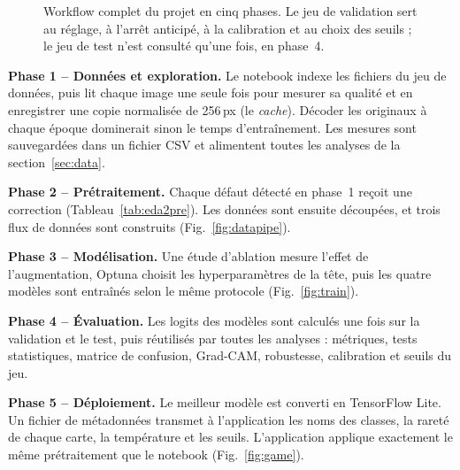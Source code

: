 \documentclass[conference]{IEEEtran}
\begin{document}
\begin{figure}[!t]
\caption{Workflow complet du projet en cinq phases. Le jeu de validation sert au réglage, à l'arrêt anticipé, à la calibration et au choix des seuils ; le jeu de test n'est consulté qu'une fois, en phase~4.}
\label{fig:workflow}
\end{figure}

\textbf{Phase 1 -- Données et exploration.} Le notebook indexe les fichiers du jeu de données, puis lit chaque image une seule fois pour mesurer sa qualité et en enregistrer une copie normalisée de 256\,px (le \emph{cache}). Décoder les originaux à chaque époque dominerait sinon le temps d'entraînement. Les mesures sont sauvegardées dans un fichier CSV et alimentent toutes les analyses de la section~\ref{sec:data}.

\textbf{Phase 2 -- Prétraitement.} Chaque défaut détecté en phase~1 reçoit une correction (Tableau~\ref{tab:eda2pre}). Les données sont ensuite découpées, et trois flux de données sont construits (Fig.~\ref{fig:datapipe}).

\textbf{Phase 3 -- Modélisation.} Une étude d'ablation mesure l'effet de l'augmentation, Optuna choisit les hyperparamètres de la tête, puis les quatre modèles sont entraînés selon le même protocole (Fig.~\ref{fig:train}).

\textbf{Phase 4 -- Évaluation.} Les logits des modèles sont calculés une fois sur la validation et le test, puis réutilisés par toutes les analyses : métriques, tests statistiques, matrice de confusion, Grad-CAM, robustesse, calibration et seuils du jeu.

\textbf{Phase 5 -- Déploiement.} Le meilleur modèle est converti en TensorFlow Lite. Un fichier de métadonnées transmet à l'application les noms des classes, la rareté de chaque carte, la température et les seuils. L'application applique exactement le même prétraitement que le notebook (Fig.~\ref{fig:game}).
\end{document}
